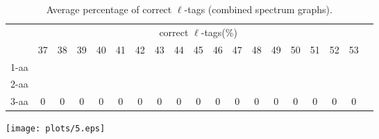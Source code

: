 \documentclass{article}
\begin{document}
\begin{table}[h]\tiny
\vspace{3mm}
{\centering
\begin{center}
\begin{tabular}{|l|c|c|c|c|c|c|c|c|c|c|c|c|c|c|c|c|c|c|}
  \hline
  & \multicolumn{ 17 }{|c|}{correct $\ell$-tags(\%)} \\
  \cline{2- 18}
    & 37 & 38 & 39 & 40 & 41 & 42 & 43 & 44 & 45 & 46 & 47 & 48 & 49 & 50 & 51 & 52 & 53\\
  \hline
1-aa  &  &  &  &  &  &  &  &  &  &  &  &  &  &  &  &  & \\
2-aa  &  &  &  &  &  &  &  &  &  &  &  &  &  &  &  &  & \\
3-aa  & 0 & 0 & 0 & 0 & 0 & 0 & 0 & 0 & 0 & 0 & 0 & 0 & 0 & 0 & 0 & 0 & 0\\
 \hline
\end{tabular}
\end{center}
\par}
\centering

\caption{ Average percentage of correct $\ell$-tags (combined spectrum graphs).}

\vspace{3mm}
\label{table:table4}
\end{table}
\texttt{[image: plots/5.eps]}
\end{document}
